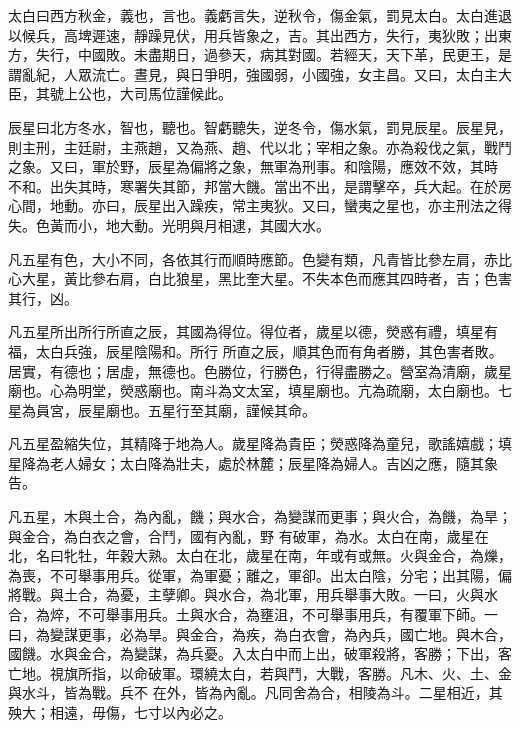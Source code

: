 \begin{pinyinscope}
 太白曰西方秋金，義也，言也。義虧言失，逆秋令，傷金氣，罰見太白。太白進退以候兵，高埤遲速，靜躁見伏，用兵皆象之，吉。其出西方，失行，夷狄敗；出東方，失行，中國敗。未盡期日，過參天，病其對國。若經天，天下革，民更王，是謂亂紀，人眾流亡。晝見，與日爭明，強國弱，小國強，女主昌。又曰，太白主大臣，其號上公也，大司馬位謹候此。



 辰星曰北方冬水，智也，聽也。智虧聽失，逆冬令，傷水氣，罰見辰星。辰星見，則主刑，主廷尉，主燕趙，又為燕、趙、代以北；宰相之象。亦為殺伐之氣，戰鬥之象。又曰，軍於野，辰星為偏將之象，無軍為刑事。和陰陽，應效不效，其時
 不和。出失其時，寒署失其節，邦當大饑。當出不出，是謂擊卒，兵大起。在於房心間，地動。亦曰，辰星出入躁疾，常主夷狄。又曰，蠻夷之星也，亦主刑法之得失。色黃而小，地大動。光明與月相逮，其國大水。



 凡五星有色，大小不同，各依其行而順時應節。色變有類，凡青皆比參左肩，赤比心大星，黃比參右肩，白比狼星，黑比奎大星。不失本色而應其四時者，吉；色害其行，凶。



 凡五星所出所行所直之辰，其國為得位。得位者，歲星以德，熒惑有禮，填星有福，太白兵強，辰星陰陽和。所行
 所直之辰，順其色而有角者勝，其色害者敗。居實，有德也；居虛，無德也。色勝位，行勝色，行得盡勝之。營室為清廟，歲星廟也。心為明堂，熒惑廟也。南斗為文太室，填星廟也。亢為疏廟，太白廟也。七星為員宮，辰星廟也。五星行至其廟，謹候其命。



 凡五星盈縮失位，其精降于地為人。歲星降為貴臣；熒惑降為童兒，歌謠嬉戲；填星降為老人婦女；太白降為壯夫，處於林麓；辰星降為婦人。吉凶之應，隨其象告。



 凡五星，木與土合，為內亂，饑；與水合，為變謀而更事；與火合，為饑，為旱；與金合，為白衣之會，合鬥，國有內亂，野
 有破軍，為水。太白在南，歲星在北，名曰牝牡，年穀大熟。太白在北，歲星在南，年或有或無。火與金合，為爍，為喪，不可舉事用兵。從軍，為軍憂；離之，軍卻。出太白陰，分宅；出其陽，偏將戰。與土合，為憂，主孽卿。與水合，為北軍，用兵舉事大敗。一曰，火與水合，為焠，不可舉事用兵。土與水合，為壅沮，不可舉事用兵，有覆軍下師。一曰，為變謀更事，必為旱。與金合，為疾，為白衣會，為內兵，國亡地。與木合，國饑。水與金合，為變謀，為兵憂。入太白中而上出，破軍殺將，客勝；下出，客亡地。視旗所指，以命破軍。環繞太白，若與鬥，大戰，客勝。凡木、火、土、金與水斗，皆為戰。兵不
 在外，皆為內亂。凡同舍為合，相陵為斗。二星相近，其殃大；相遠，毋傷，七寸以內必之。




\end{pinyinscope}
